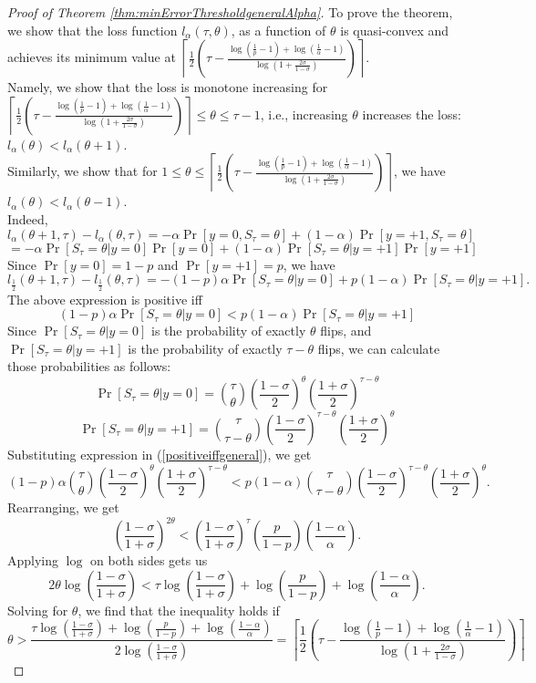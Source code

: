 \begin{proof}[Proof of Theorem \ref{thm:minErrorThresholdgeneralAlpha}]
To prove the theorem, we show that the loss function $l_{\alpha}(\tau,\theta)$, as a function of $\theta$  is quasi-convex and achieves its minimum value at $\left\lceil \frac{1}{2}(\tau-\frac{\log(\frac{1}{p}-1)+\log(\frac{1}{\alpha}-1)}{\log(1+\frac{2\sigma}{1-\sigma})})\right\rceil$.\\
Namely, we show that the loss is monotone increasing for  $\left\lceil \frac{1}{2}(\tau-\frac{\log(\frac{1}{p}-1)+\log(\frac{1}{\alpha}-1)}{\log(1+\frac{2\sigma}{1-\sigma})})\right\rceil\leq \theta \leq \tau-1$, i.e.,
increasing $\theta$ increases the loss: $l_{\alpha}(\theta)<l_{\alpha}(\theta+1)$.\\
Similarly, we show that for $1\leq  \theta\leq \left\lceil \frac{1}{2}(\tau-\frac{\log(\frac{1}{p}-1)+\log(\frac{1}{\alpha}-1)}{\log(1+\frac{2\sigma}{1-\sigma})}) \right\rceil$, we have
$l_{\alpha}(\theta)<l_{\alpha}(\theta-1)$.\\
Indeed,
\[
l_{\alpha}(\theta+1,\tau)-l_{\alpha}(\theta,\tau)=
-\alpha\Pr[y=0,S_{\tau}=\theta] +(1-\alpha)\Pr[y=+1,S_{\tau}=\theta] \]
\[
=-\alpha \Pr[S_{\tau}=\theta|y=0]
\Pr[y=0]+
(1-\alpha)\Pr[S_{\tau}=\theta|y=+1]
\Pr[y=+1]\]
Since $\Pr[y=0]=1-p$ and $\Pr[y=+1]=p$,  we have
\[
l_{\frac{1}{2}}(\theta+1,\tau)-l_{\frac{1}{2}}(\theta,\tau)=-(1-p)\alpha\Pr[S_{\tau}=\theta|y=0]+
p(1-\alpha)\Pr[S_{\tau}=\theta|y=+1].
\]
The above expression is positive iff
\begin{equation}\label{positiveiffgeneral}
    (1-p)\alpha\Pr[S_{\tau}=\theta|y=0]<
p(1-\alpha)\Pr[S_{\tau}=\theta|y=+1]
\end{equation}
Since $\Pr[S_{\tau}=\theta|y=0]$ is the probability of exactly $\theta$ flips, and $\Pr[S_{\tau}=\theta|y=+1]$ is the probability of exactly $\tau-\theta$ flips, we can calculate those probabilities as follows: 
\[
\Pr[S_{\tau}=\theta|y=0]={\tau \choose \theta}(\frac{1-\sigma}{2})^\theta(\frac{1+\sigma}{2})^{\tau-\theta}
\]
\[
\Pr[S_{\tau}=\theta|y=+1]={\tau \choose \tau-\theta}(\frac{1-\sigma}{2})^{\tau-\theta}(\frac{1+\sigma}{2})^{\theta}
\]
Substituting expression in (\ref{positiveiffgeneral}), we get
\[
(1-p)\alpha{\tau \choose \theta}(\frac{1-\sigma}{2})^\theta(\frac{1+\sigma}{2})^{\tau-\theta}<
p(1-\alpha){\tau \choose \tau-\theta}(\frac{1-\sigma}{2})^{\tau-\theta}(\frac{1+\sigma}{2})^{\theta}.
\]
Rearranging, we get
\[
(\frac{1-\sigma}{1+\sigma})^{2\theta}<(\frac{1-\sigma}{1+\sigma})^{\tau}(\frac{p}{1-p})(\frac{1-\alpha}{\alpha}).
\]
Applying $\log$ on both sides gets us
\[
2\theta\log(\frac{1-\sigma}{1+\sigma})<\tau\log(\frac{1-\sigma}{1+\sigma})+\log(\frac{p}{1-p})+\log(\frac{1-\alpha}{\alpha}).
\]
Solving for $\theta$, we find that the inequality holds if
\[
\theta>\frac{\tau\log(\frac{1-\sigma}{1+\sigma})+\log(\frac{p}{1-p})+\log(\frac{1-\alpha}{\alpha})}{2\log(\frac{1-\sigma}{1+\sigma})}=\left\lceil \frac{1}{2}(\tau-\frac{\log(\frac{1}{p}-1)+\log(\frac{1}{\alpha}-1)}{\log(1+\frac{2\sigma}{1-\sigma})})\right \rceil
\]


\end{proof}
